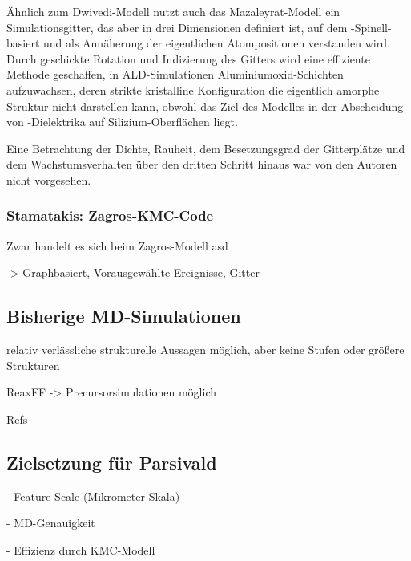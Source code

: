 Ähnlich zum Dwivedi-Modell nutzt auch das Mazaleyrat-Modell \cite{mazaleyrat_methodology_2005} ein Simulationsgitter, das aber in drei Dimensionen definiert ist, auf dem -Spinell-basiert und als Annäherung der eigentlichen Atompositionen verstanden wird.
Durch geschickte Rotation und Indizierung des Gitters wird eine effiziente Methode geschaffen, in ALD-Simulationen Aluminiumoxid-Schichten aufzuwachsen, deren strikte kristalline Konfiguration die eigentlich amorphe Struktur nicht darstellen kann, obwohl das Ziel des Modelles in der Abscheidung von -Dielektrika auf Silizium-Oberflächen liegt.

Eine Betrachtung der Dichte, Rauheit, dem Besetzungsgrad der Gitterplätze und dem Wachstumsverhalten über den dritten Schritt hinaus war von den Autoren nicht vorgesehen.

\subsubsection{Stamatakis: Zagros-KMC-Code}

Zwar handelt es sich beim Zagros-Modell asd

-> Graphbasiert, Vorausgewählte Ereignisse, Gitter


\subsection{Bisherige MD-Simulationen}

relativ verlässliche strukturelle Aussagen möglich, aber keine Stufen oder größere Strukturen

ReaxFF -> Precursorsimulationen möglich

Refs


\subsection{Zielsetzung für Parsivald}

- Feature Scale (Mikrometer-Skala)

- MD-Genauigkeit

- Effizienz durch KMC-Modell
